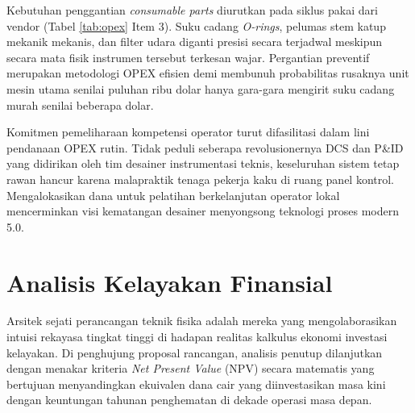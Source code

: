 \documentclass[12pt, a4paper]{report}
\begin{document}
\begin{table}[htbp]
\centering
\caption{Proyeksi Estimasi Operational Expenditure (OPEX) Tahunan Plant XYZ}
\label{tab:opex}
\end{table}

Kebutuhan penggantian \textit{consumable parts} diurutkan pada siklus pakai dari vendor (Tabel \ref{tab:opex} Item 3). Suku cadang \textit{O-rings}, pelumas stem katup mekanik mekanis, dan filter udara diganti presisi secara terjadwal meskipun secara mata fisik instrumen tersebut terkesan wajar. Pergantian preventif merupakan metodologi OPEX efisien demi membunuh probabilitas rusaknya unit mesin utama senilai puluhan ribu dolar hanya gara-gara mengirit suku cadang murah senilai beberapa dolar.

Komitmen pemeliharaan kompetensi operator turut difasilitasi dalam lini pendanaan OPEX rutin. Tidak peduli seberapa revolusionernya DCS dan P\&ID yang didirikan oleh tim desainer instrumentasi teknis, keseluruhan sistem tetap rawan hancur karena malapraktik tenaga pekerja kaku di ruang panel kontrol. Mengalokasikan dana untuk pelatihan berkelanjutan operator lokal mencerminkan visi kematangan desainer menyongsong teknologi proses modern 5.0.

\section{Analisis Kelayakan Finansial}
Arsitek sejati perancangan teknik fisika adalah mereka yang mengolaborasikan intuisi rekayasa tingkat tinggi di hadapan realitas kalkulus ekonomi investasi kelayakan. Di penghujung proposal rancangan, analisis penutup dilanjutkan dengan menakar kriteria \textit{Net Present Value} (NPV) secara matematis yang bertujuan menyandingkan ekuivalen dana cair yang diinvestasikan masa kini dengan keuntungan tahunan penghematan di dekade operasi masa depan.
\end{document}
